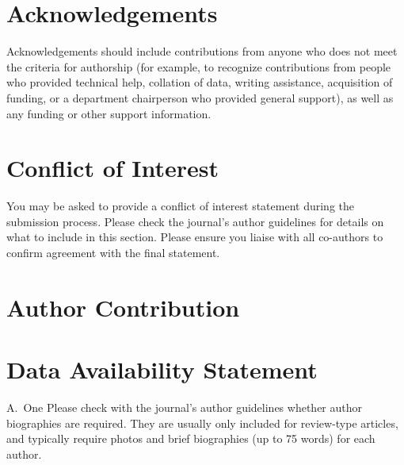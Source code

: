 \documentclass[alpha-refs]{wiley-article}
\begin{document}
\section*{Acknowledgements}
Acknowledgements should include contributions from anyone who does not meet the criteria for authorship (for example, to recognize contributions from people who provided technical help, collation of data, writing assistance, acquisition of funding, or a department chairperson who provided general support), as well as any funding or other support information.

\section*{Conflict of Interest}
You may be asked to provide a conflict of interest statement during the submission process. Please check the journal's author guidelines for details on what to include in this section. Please ensure you liaise with all co-authors to confirm agreement with the final statement.

\section*{Author Contribution}

\section*{Data Availability Statement}

\printendnotes



\begin{biography}{A.~One}
Please check with the journal's author guidelines whether author biographies are required. They are usually only included for review-type articles, and typically require photos and brief biographies (up to 75 words) for each author.
\bigskip
\bigskip
\end{biography}

\end{document}
